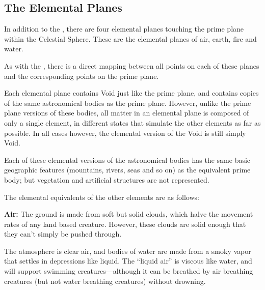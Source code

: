 \begin{multicols*}{2}
\section{The Elemental Planes}\label{sec:The Elemental Planes}
In addition to the , there are four elemental planes touching the prime plane within the Celestial Sphere. These are the elemental planes of air, earth, fire and water.

As with the , there is a direct mapping between all points on each of these planes and the corresponding points on the prime plane.

Each elemental plane contains Void just like the prime plane, and contains copies of the same astronomical bodies as the prime plane. However, unlike the prime plane versions of these bodies, all matter in an elemental plane is composed of only a single element, in different states that simulate the other elements as far as possible. In all cases however, the elemental version of the Void is still simply Void.

Each of these elemental versions of the astronomical bodies has the same basic geographic features (mountains, rivers, seas and so on) as the equivalent prime body; but vegetation and artificial structures are not represented.


The elemental equivalents of the other elements are as follows:

\textbf{Air:}\label{sec:Elemental Plane of Air} The ground is made from soft but solid clouds, which halve the movement rates of any land based creature. However, these clouds are solid enough that they can’t simply be pushed through.

The atmosphere is clear air, and bodies of water are made from a smoky vapor that settles in depressions like liquid. The “liquid air” is viscous like water, and will support swimming creatures—although it can be breathed by air breathing creatures (but not water breathing creatures) without drowning.


\end{multicols*}
